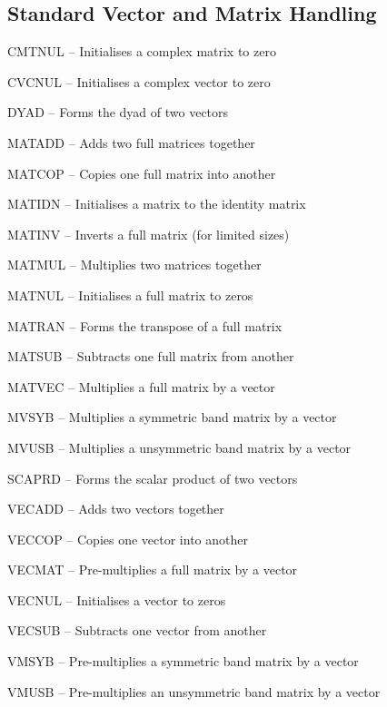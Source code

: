 \subsection*{Standard Vector and Matrix Handling} %
\begin{list}{}{\leftmargin=57pt }
\item[CMTNUL \hfill] -- Initialises a complex matrix to zero
\item[CVCNUL \hfill] -- Initialises a complex vector to zero
\item[DYAD \hfill]   -- Forms the dyad of two vectors
\item[MATADD \hfill]  -- Adds two full matrices together
\item[MATCOP \hfill] -- Copies one full matrix into another
\item[MATIDN \hfill] -- Initialises a matrix to the identity matrix
\item[MATINV \hfill] -- Inverts a full matrix (for limited sizes)
\item[MATMUL \hfill] -- Multiplies two matrices together
\item[MATNUL \hfill] -- Initialises a full matrix to zeros
\item[MATRAN \hfill] -- Forms the transpose of a full matrix
\item[MATSUB \hfill] -- Subtracts one full matrix from another
\item[MATVEC \hfill] -- Multiplies a full matrix by a vector
\item[MVSYB \hfill]  -- Multiplies a symmetric band matrix by a vector
\item[MVUSB \hfill]  -- Multiplies a unsymmetric band matrix by a vector
\item[SCAPRD \hfill] -- Forms the scalar product of two vectors
\item[VECADD \hfill] -- Adds two vectors together
\item[VECCOP \hfill] -- Copies one vector into another
\item[VECMAT \hfill] -- Pre-multiplies a full matrix by a vector
\item[VECNUL \hfill] -- Initialises a vector to zeros
\item[VECSUB \hfill] -- Subtracts one vector from another
\item[VMSYB \hfill]  -- Pre-multiplies a symmetric band matrix by a vector
\item[VMUSB \hfill]  -- Pre-multiplies an unsymmetric band matrix by a vector
\end{list}
